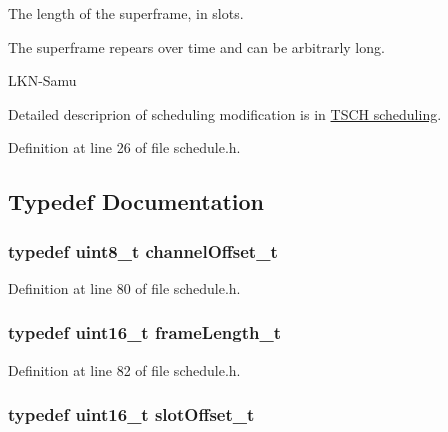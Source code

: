 The length of the superframe, in slots. 

The superframe repears over time and can be arbitrarly long.

\begin{DoxyRefDesc}{L\+K\+N-\/\+Samu}
\item[\hyperlink{_l_k_n_code_edits__LKN_code_edits000005}{L\+K\+N-\/\+Samu}]Detailed descriprion of scheduling modification is in \hyperlink{_l_k_n_contribution_TSCH_scheduling}{T\+S\+CH scheduling}.\end{DoxyRefDesc}


Definition at line 26 of file schedule.\+h.



\subsection{Typedef Documentation}
\subsubsection[{\texorpdfstring{channel\+Offset\+\_\+t}{channelOffset_t}}]{\setlength{\rightskip}{0pt plus 5cm}typedef {\bf uint8\+\_\+t} {\bf channel\+Offset\+\_\+t}}\hypertarget{group___schedule_gab53645758fe83985f0b35af7c5c2115e}{}\label{group___schedule_gab53645758fe83985f0b35af7c5c2115e}


Definition at line 80 of file schedule.\+h.

\subsubsection[{\texorpdfstring{frame\+Length\+\_\+t}{frameLength_t}}]{\setlength{\rightskip}{0pt plus 5cm}typedef {\bf uint16\+\_\+t} {\bf frame\+Length\+\_\+t}}\hypertarget{group___schedule_gab960413860c0b01b38ece025b0ee534d}{}\label{group___schedule_gab960413860c0b01b38ece025b0ee534d}


Definition at line 82 of file schedule.\+h.

\subsubsection[{\texorpdfstring{slot\+Offset\+\_\+t}{slotOffset_t}}]{\setlength{\rightskip}{0pt plus 5cm}typedef {\bf uint16\+\_\+t} {\bf slot\+Offset\+\_\+t}}\hypertarget{group___schedule_ga30a663860a70d8c9db2c3a8e66f544fc}{}\label{group___schedule_ga30a663860a70d8c9db2c3a8e66f544fc}



